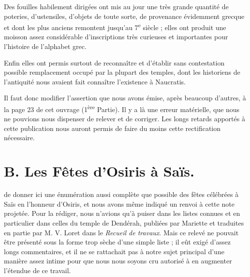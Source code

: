 \documentclass[letterpaper,twocolumn,openany,nodeprecatedcode]{dndbook}
\begin{document}
Des fouilles habilement dirigées ont mis au jour une très grande quantité de poteries, d'ustensiles, d'objets de toute sorte, de provenance évidemment grecque et dont les plus anciens remontent jusqu'au 7\textsuperscript{e} siècle ; elles ont produit une moisson assez considérable d'inscriptions très curieuses et importantes pour l'histoire de l'alphabet grec.

Enfin elles ont permis surtout de reconnaître et d'établir sans contestation possible remplacement occupé par la plupart des temples, dont les historiens de l'antiquité nous avaient fait connaître l'existence à Naucratis.

Il faut donc modifier l'assertion que nous avons émise, après beaucoup d'autres, à la page 23 de cet ouvrage (1\textsuperscript{ère} Partie). Il y a là une erreur matérielle, que nous ne pouvions nous dispenser de relever et de corriger. Les longs retards apportés à cette publication nous auront permis de faire du moins cette rectification nécessaire.
\clearpage
\section{B. Les Fêtes d'Osiris à Saïs.}
 de donner ici une énumération aussi complète que possible des fêtes célébrées à Saïs en l'honneur d'Osiris, et nous avons même indiqué un renvoi à cette note projetée. Pour la rédiger, nous n'avions qu'à puiser dans les listes connues et en particulier dans celles du temple de Dendérah, publiées par Mariette et traduites en partie par M. V. Loret dans le \emph{Recueil de travaux}. Mais ce relevé ne pouvait être présenté sous la forme trop sèche d'une simple liste ; il eût exigé d'assez longs commentaires, et il ne se rattachait pas à notre sujet principal d'une manière assez intime pour que nous nous soyons cru autorisé à en augmenter l'étendue de ce travail.
\clearpage
\end{document}
